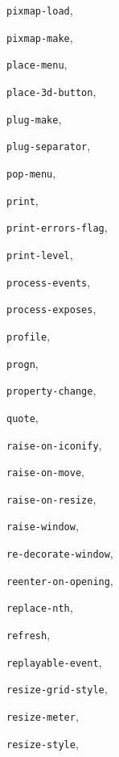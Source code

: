 \begin{theindex}
\item {\tt pixmap-load}, {\bf\pageref{pixmap-load}}
\item {\tt pixmap-make}, {\bf\pageref{pixmap-make}}
\item {\tt place-menu}, {\bf\pageref{place-menu}}
\item {\tt place-3d-button}, {\bf\pageref{place-3d-button}}
\item {\tt plug-make}, {\bf\pageref{plug-make}}
\item {\tt plug-separator}, {\bf\pageref{plug-separator}}
\item {\tt pop-menu}, {\bf\pageref{pop-menu}}
\item {\tt print}, {\bf\pageref{print}}
\item {\tt print-errors-flag}, {\bf\pageref{print-errors-flag}}
\item {\tt print-level}, {\bf\pageref{print-level}}
\item {\tt process-events}, {\bf\pageref{process-events}}
\item {\tt process-exposes}, {\bf\pageref{process-exposes}}
\item {\tt profile}, {\bf\pageref{standard-profile}}
\item {\tt progn}, {\bf\pageref{progn}}
\item {\tt property-change}, {\bf\pageref{property-change}}
\item {\tt quote}, {\bf\pageref{quote}}
\item {\tt raise-on-iconify}, {\bf\pageref{raise-on-move}}
\item {\tt raise-on-move}, {\bf\pageref{raise-on-move}}
\item {\tt raise-on-resize}, {\bf\pageref{raise-on-move}}
\item {\tt raise-window}, {\bf\pageref{raise-window}}
\item {\tt re-decorate-window}, {\bf\pageref{re-decorate-window}}
\item {\tt reenter-on-opening}, {\bf\pageref{reenter-on-opening}}
\item {\tt replace-nth}, {\bf\pageref{replace-nth}}
\item {\tt refresh}, {\bf\pageref{refresh}}
\item {\tt replayable-event}, {\bf\pageref{replayable-event}}
\item {\tt resize-grid-style}, {\bf\pageref{resize-grid-style}}
\item {\tt resize-meter}, {\bf\pageref{resize-meter}}
\item {\tt resize-style}, {\bf\pageref{resize-style}}

\end{theindex}
